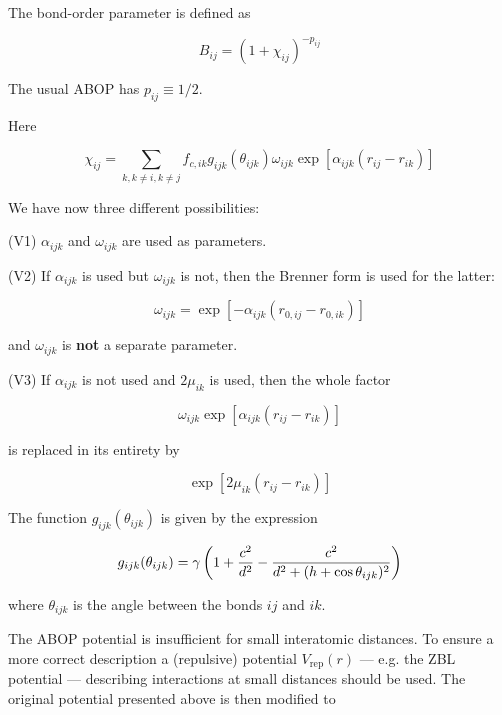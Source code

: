 \documentclass[a4paper,12pt,pdftex,onecolumn]{article}
\begin{document}
The bond-order parameter is defined as

\begin{equation}
B_{ij} = \left( 1 + \chi_{ij} \right)^{-p_{ij}}
\end{equation}

The usual ABOP has $p_{ij} \equiv 1/2$.

Here

\begin{equation}
\chi_{ij} =
\sum_{k, k \neq i, k \neq j} f_{c,ik} g_{ijk}(\theta_{ijk})
\omega_{ijk} \exp\left[ \alpha_{ijk}(r_{ij} - r_{ik}) \right]
\end{equation}

We have now three different possibilities:

(V1) $\alpha_{ijk}$ and $\omega_{ijk}$ are used as parameters.

(V2) If $\alpha_{ijk}$ is used but $\omega_{ijk}$ is not, then the
Brenner form is used for the latter:

\begin{equation}
\omega_{ijk} = \exp\left[
- \alpha_{ijk} ( r_{0,ij} - r_{0,ik})
\right]
\label{eq:omegaijk}
\end{equation}

and $\omega_{ijk}$ is \textbf{not} a separate parameter.

(V3) If $\alpha_{ijk}$ is not used and $2\mu_{ik}$ is used, then the
whole factor

\begin{equation}
\omega_{ijk} \exp\left[ \alpha_{ijk}(r_{ij} - r_{ik}) \right]
\end{equation}

is replaced in its entirety by

\begin{equation}
\exp\left[ 2\mu_{ik} (r_{ij} - r_{ik}) \right]
\end{equation}

The function $g_{ijk}(\theta_{ijk})$ is given by the expression

\begin{equation}
g_{ijk}(\theta_{ijk}) = \gamma \left(
1 + {c^2 \over d^2} - {c^2 \over d^2 + (h + \cos \theta_{ijk})^2}
\right)
\end{equation}

where $\theta_{ijk}$ is the angle between the bonds $ij$ and $ik$.

The ABOP potential is insufficient for small interatomic distances.
To ensure a more correct description a (repulsive) potential
$V_{\mathrm{rep}}(r)$ --- e.g. the ZBL potential --- describing
interactions at small distances should be used.
The original potential presented above is then modified to
\end{document}
